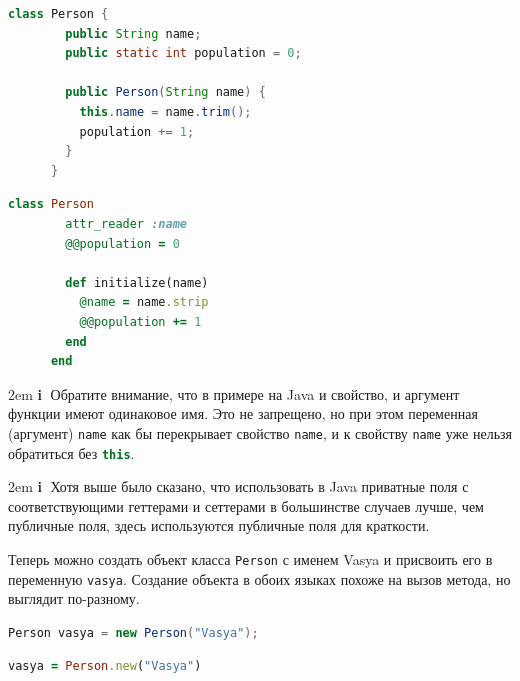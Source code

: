 \documentclass[a4paper, 14pt, titlepage]{extarticle}
\newenvironment{indented}%
    { \begingroup %
        \noindent %
        \leftskip2em %
        \rightskip\leftskip }%
    { \par\endgroup }
\newenvironment{extrainfo}%
    { \begin{indented} %
        \color{dkblue} %
        \small %
        \textbf{\textcircled{\footnotesize i}} }%
    { \end{indented} }
\newenvironment{halfpage}%
    {\noindent\begin{minipage}[h]{0.49\linewidth}} %
    {\end{minipage}\hfill}
\newcommand{\inlinecode}[2][Java]{\lstinline[basicstyle=\ttfamily, language=#1]{#2}}
\begin{document}
  \begin{halfpage}
    \begin{lstlisting}[language=Java, title={Конструктор с параметром в Java}, gobble=6, texcl]
      class Person {
        public String name;
        public static int population = 0;

        public Person(String name) {
          this.name = name.trim();
          population += 1;
        }
      }
    \end{lstlisting}
  \end{halfpage}
  \begin{halfpage}
    \begin{lstlisting}[language=Ruby, title={Конструктор с параметром в Ruby}, gobble=6, texcl]
      class Person
        attr_reader :name
        @@population = 0

        def initialize(name)
          @name = name.strip
          @@population += 1
        end
      end
    \end{lstlisting}
  \end{halfpage}

  \begin{extrainfo}
    Обратите внимание, что в примере на Java и свойство, и аргумент функции имеют одинаковое имя.
    Это не запрещено, но при этом переменная (аргумент) \inlinecode{name} как бы перекрывает
    свойство \inlinecode{name}, и к свойству \inlinecode{name} уже нельзя обратиться без
    \inlinecode[Java]{this}.
  \end{extrainfo}

  \begin{extrainfo}
    Хотя выше было сказано, что использовать в Java приватные поля с соответствующими геттерами и
    сеттерами в большинстве случаев лучше, чем публичные поля, здесь используются публичные поля для
    краткости.
  \end{extrainfo}

  Теперь можно создать объект класса \inlinecode{Person} с именем Vasya и присвоить его в
  переменную \inlinecode{vasya}. Создание объекта в обоих языках похоже на вызов метода, но выглядит
  по-разному.

  \begin{halfpage}
    \begin{lstlisting}[language=Java, title={Создание объекта в Java}, gobble=6, texcl]
      Person vasya = new Person("Vasya");
    \end{lstlisting}
  \end{halfpage}
  \begin{halfpage}
    \begin{lstlisting}[language=Ruby, title={Создание объекта в Ruby}, gobble=6, texcl]
      vasya = Person.new("Vasya")
    \end{lstlisting}
  \end{halfpage}
\end{document}
